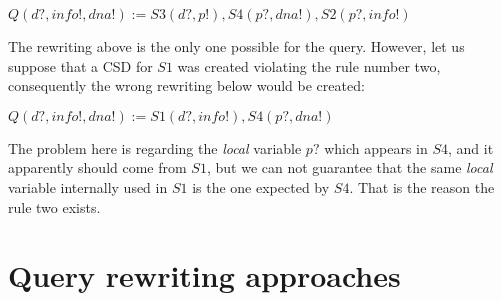 \documentclass[12pt,a4paper,oneside]{article}
\begin{document}
\begin{center}
$Q (d?, info!, dna!) := S3(d?, p!), S4(p?, dna!), S2(p?, info!)$ \\
\end{center}  

The rewriting above is the only one possible for the query. 
However, let us suppose that a CSD for $S1$ was created violating the rule number two, consequently the wrong rewriting below would be created:

\begin{center}
$Q (d?, info!, dna!) := S1(d?, info!),S4(p?, dna!)$ \\
\end{center}  

The problem here is regarding the \textit{local} variable $p?$ which appears in $S4$, and it apparently should come from $S1$, but we can not guarantee that the same \textit{local} variable internally used in $S1$ is the one expected by $S4$. 
That is the reason the rule two exists.

\section{Query rewriting approaches}


%
%
\end{document}
